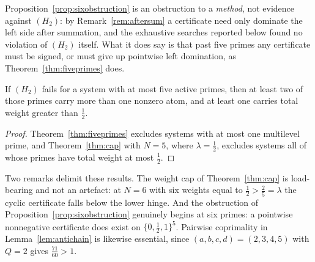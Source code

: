 Proposition~\ref{prop:sixobstruction} is an obstruction to a \emph{method}, not evidence against
$(H_2)$: by Remark~\ref{rem:aftersum} a certificate need only dominate the left side after
summation, and the exhaustive searches reported below found no violation of $(H_2)$ itself. What it
does say is that past five primes any certificate must be signed, or must give up pointwise left
domination, as Theorem~\ref{thm:fiveprimes} does.

\begin{corollary}\label{cor:fivesurviving}
If $(H_2)$ fails for a system with at most five active primes, then at least two of those primes carry
more than one nonzero atom, and at least one carries total weight greater than $\tfrac12$.
\end{corollary}
\begin{proof}
Theorem~\ref{thm:fiveprimes} excludes systems with at most one multilevel prime, and
Theorem~\ref{thm:cap} with $N=5$, where $\lambda=\tfrac12$, excludes systems all of whose primes have
total weight at most $\tfrac12$.
\end{proof}

Two remarks delimit these results. The weight cap of Theorem~\ref{thm:cap} is load-bearing and not an
artefact: at $N=6$ with six weights equal to $\tfrac12>\tfrac25=\lambda$ the cyclic certificate falls
below the lower hinge. And the obstruction of Proposition~\ref{prop:sixobstruction} genuinely begins
at six primes: a pointwise nonnegative certificate does exist on $\{0,\tfrac12,1\}^5$. Pairwise
coprimality in Lemma~\ref{lem:antichain} is likewise essential, since $(a,b,c,d)=(2,3,4,5)$ with
$Q=2$ gives $\tfrac{71}{60}>1$.

